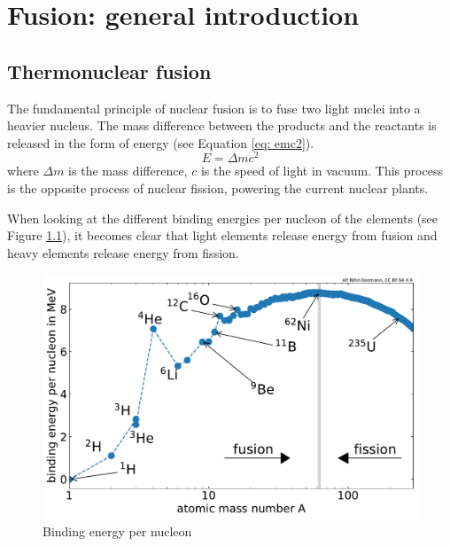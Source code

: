 \setchapterpreamble[u]{\margintoc}
\chapter{Fusion: general introduction}\label{Chapter1}


\section{Thermonuclear fusion}

The fundamental principle of nuclear fusion is to fuse two light nuclei into a heavier nucleus.
The mass difference between the products and the reactants is released in the form of energy (see Equation \ref{eq: emc2}).
\begin{equation}
    E = \Delta m c^2
    \label{eq: emc2}
\end{equation}
where $\Delta m$ is the mass difference, $c$ is the speed of light in vacuum.
This process is the opposite process of nuclear fission, powering the current nuclear plants.

When looking at the different binding energies per nucleon of the elements (see Figure \ref{fig: binding energy per nucleon}), it becomes clear that light elements release energy from fusion and heavy elements release energy from fission.

\begin{figure} [h]
    \centering
    \includegraphics[width=\linewidth]{Figures/Chapter1/binding_energy_per_nucleon.pdf}
    \caption{Binding energy per nucleon \cite{kohn-seemann_alfkoehnfusion_plots_2021}}
    \label{fig: binding energy per nucleon}
\end{figure}

